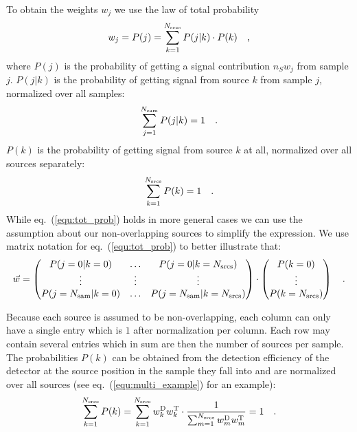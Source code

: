 To obtain the weights $w_j$ we use the law of total probability
\begin{equation}
  w_j = P(j) = \sum_{k=1}^{N_\text{srcs}} P(j| k)\cdot P(k) \quad\text{,}
\label{equ:tot_prob}
\end{equation}
where $P(j)$ is the probability of getting a signal contribution $\hat{n}_S w_j$ from sample $j$.
$P(j|k)$ is the probability of getting signal from source $k$ from sample $j$, normalized over all samples:
\begin{equation}
  \sum_{j=1}^{N_\text{sam}} P(j|k) = 1 \quad\text{.}
\end{equation}
$P(k)$ is the probability of getting signal from source $k$ at all, normalized over all sources separately:
\begin{equation}
  \sum_{k=1}^{N_\text{srcs}} P(k) = 1 \quad\text{.}
\end{equation}
While eq.~(\ref{equ:tot_prob}) holds in more general cases we can use the assumption about our non-overlapping sources to simplify the expression.
We use matrix notation for eq.~(\ref{equ:tot_prob}) to better illustrate that:
\begin{equation}
  \vec{w} =
    \begin{pmatrix}
      P(j=0|k=0) & \dots & P(j=0|k=N_\text{srcs}) \\
      \vdots & \vdots & \vdots \\
      P(j=N_\text{sam}|k=0) & \dots & P(j=N_\text{sam}|k=N_\text{srcs})
    \end{pmatrix} \cdot
    \begin{pmatrix}
      P(k=0) \\ \vdots \\ P(k=N_\text{srcs})
    \end{pmatrix} \quad\text{.}
\end{equation}

Because each source is assumed to be non-overlapping, each column can only have a single entry which is $1$ after normalization per column.
Each row may contain several entries which in sum are then the number of sources per sample.
The probabilities $P(k)$ can be obtained from the detection efficiency of the detector at the source position in the sample they fall into and are normalized over all sources (see eq.~(\ref{equ:multi_example}) for an example):
\begin{equation}
  \sum_{k=1}^{N_\text{srcs}} P(k)
    = \sum_{k=1}^{N_\text{srcs}} w^\text{D}_k w^\text{T}_k \cdot
      \frac{1}{\sum_{m=1}^{N_\text{srcs}} w^\text{D}_m w^\text{T}_m}
    = 1
  \quad\text{.}
\end{equation}

